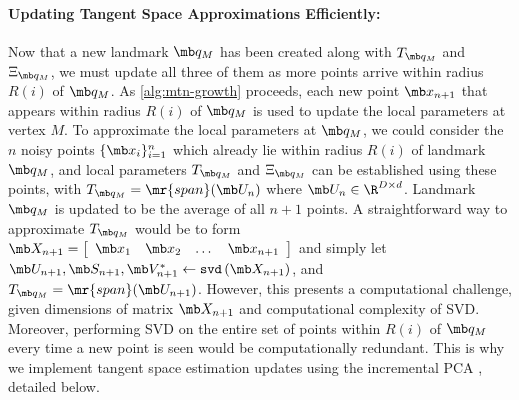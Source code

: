 \paragraph{Updating Tangent Space Approximations Efficiently:} Now that a new landmark $\mb q_M$ has been created along with $T_{\mb q_M}$ and $\Xi_{\mb q_M}$, we must update all three of them as more points arrive within radius $R(i)$ of $\mb q_M$. As \cref{alg:mtn-growth} proceeds, each new point $\mb x_{n+1}$ that appears within radius $R(i)$ of $\mb q_M$ is used to update the local parameters at vertex $M$. To approximate the local parameters at $\mb q_M$, we could consider the $n$ noisy points $\{\mb x_i\}_{i=1}^n$ which already lie within radius $R(i)$ of landmark $\mb q_M$, and local parameters $T_{\mb q_M}$ and $\Xi_{\mb q_M}$ can be established using these points, with $T_{\mb q_M} = \mr{span}(\mb U_n)$ where $\mb U_n \in \R^{D \times d}$. Landmark $\mb q_M$ is updated to be the average of all $n+1$ points. A straightforward way to approximate $T_{\mb q_M}$ would be to form $\mb X_{n+1} = \left[ \begin{array}{cccc} \mb x_1 & \mb x_2 & \dots & \mb x_{n+1} \end{array} \right]$ and simply let $\mb U_{n+1}, \mb S_{n+1}, \mb V_{n+1}^\ast \leftarrow \texttt{svd} \left(\mb X_{n+1} \right)$, and $ T_{\mb q_M} = \mr{span}(\mb U_{n+1})$. However, this presents a computational challenge, given dimensions of matrix $\mb X_{n+1}$ and computational complexity of SVD. Moreover, performing SVD on the entire set of points within $R(i)$ of $\mb q_M$ every time a new point is seen would be computationally redundant. This is why we implement tangent space estimation updates using the incremental PCA \cite{brand2006fast, arora2012stochastic}, detailed below.

